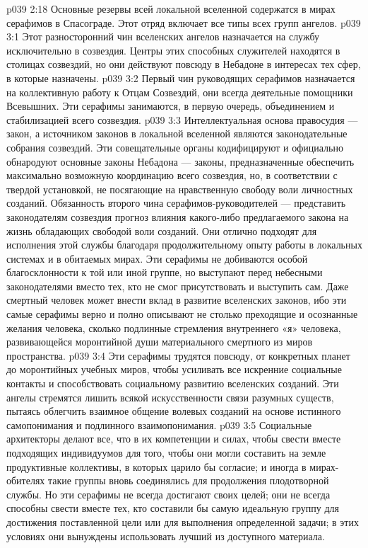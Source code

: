 \vs p039 2:18 \pc Основные резервы всей локальной вселенной содержатся в мирах серафимов в Спасограде. Этот отряд включает все типы всех групп ангелов.
\vs p039 3:1 Этот разносторонний чин вселенских ангелов назначается на службу исключительно в созвездия. Центры этих способных служителей находятся в столицах созвездий, но они действуют повсюду в Небадоне в интересах тех сфер, в которые назначены.
\vs p039 3:2 \bibnobreakspace {} Первый чин руководящих серафимов назначается на коллективную работу к Отцам Созвездий, они всегда деятельные помощники Всевышних. Эти серафимы занимаются, в первую очередь, объединением и стабилизацией всего созвездия.
\vs p039 3:3 \bibnobreakspace {} Интеллектуальная основа правосудия --- закон, а источником законов в локальной вселенной являются законодательные собрания созвездий. Эти совещательные органы кодифицируют и официально обнародуют основные законы Небадона --- законы, предназначенные обеспечить максимально возможную координацию всего созвездия, но, в соответствии с твердой установкой, не посягающие на нравственную свободу воли личностных созданий. Обязанность второго чина серафимов\hyp{}руководителей --- представить законодателям созвездия прогноз влияния какого\hyp{}либо предлагаемого закона на жизнь обладающих свободой воли созданий. Они отлично подходят для исполнения этой службы благодаря продолжительному опыту работы в локальных системах и в обитаемых мирах. Эти серафимы не добиваются особой благосклонности к той или иной группе, но выступают перед небесными законодателями вместо тех, кто не смог присутствовать и выступить сам. Даже смертный человек может внести вклад в развитие вселенских законов, ибо эти самые серафимы верно и полно описывают не столько преходящие и осознанные желания человека, сколько подлинные стремления внутреннего «я» человека, развивающейся моронтийной души материального смертного из миров пространства.
\vs p039 3:4 \bibnobreakspace {} Эти серафимы трудятся повсюду, от конкретных планет до моронтийных учебных миров, чтобы усиливать все искренние социальные контакты и способствовать социальному развитию вселенских созданий. Эти ангелы стремятся лишить всякой искусственности связи разумных существ, пытаясь облегчить взаимное общение волевых созданий на основе истинного самопонимания и подлинного взаимопонимания.
\vs p039 3:5 Социальные архитекторы делают все, что в их компетенции и силах, чтобы свести вместе подходящих индивидуумов для того, чтобы они могли составить на земле продуктивные коллективы, в которых царило бы согласие; и иногда в мирах\hyp{}обителях такие группы вновь соединялись для продолжения плодотворной службы. Но эти серафимы не всегда достигают своих целей; они не всегда способны свести вместе тех, кто составили бы самую идеальную группу для достижения поставленной цели или для выполнения определенной задачи; в этих условиях они вынуждены использовать лучший из доступного материала.

